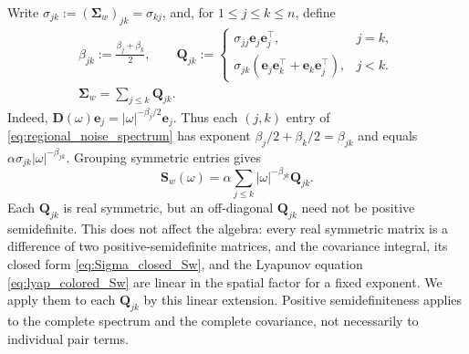 \documentclass[12pt]{article}
\begin{document}
Write $\sigma_{jk}:=(\boldsymbol\Sigma_w)_{jk}=\sigma_{kj}$, and, for $1\leq j\leq k\leq n$, define
\begin{equation}
\begin{gathered}
\beta_{jk}:=\frac{\beta_j+\beta_k}{2},\qquad
\mathbf Q_{jk}:=
\begin{cases}
\sigma_{jj}\mathbf e_j\mathbf e_j^\top,&j=k,\\
\sigma_{jk}(\mathbf e_j\mathbf e_k^\top+\mathbf e_k\mathbf e_j^\top),&j<k.
\end{cases}\\
\boldsymbol\Sigma_w=\sum_{j\leq k}\mathbf Q_{jk}.
\end{gathered}
\label{eq:regional_pair_definitions}
\end{equation}
Indeed, $\mathbf D(\omega)\mathbf e_j=|\omega|^{-\beta_j/2}\mathbf e_j$. Thus each
$(j,k)$ entry of \eqref{eq:regional_noise_spectrum} has exponent
$\beta_j/2+\beta_k/2=\beta_{jk}$ and equals
$\alpha\sigma_{jk}|\omega|^{-\beta_{jk}}$. Grouping symmetric entries gives
\begin{equation}
\mathbf S_w(\omega)
=\alpha\sum_{j\leq k}|\omega|^{-\beta_{jk}}\mathbf Q_{jk}.
\label{eq:regional_noise_expansion}
\end{equation}
Each $\mathbf Q_{jk}$ is real symmetric, but an off-diagonal $\mathbf Q_{jk}$ need not be positive semidefinite.
This does not affect the algebra: every real symmetric matrix is a difference of two positive-semidefinite matrices,
and the covariance integral, its closed form \eqref{eq:Sigma_closed_Sw}, and the Lyapunov equation
\eqref{eq:lyap_colored_Sw} are linear in the spatial factor for a fixed exponent. We apply them to each
$\mathbf Q_{jk}$ by this linear extension. Positive semidefiniteness applies to the complete spectrum and
the complete covariance, not necessarily to individual pair terms.
\end{document}
